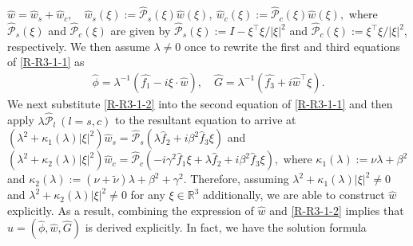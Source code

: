\documentclass[dvipdfmx,12pt]{article}
\begin{document}
$
\widehat{w}=\widehat{w}_s+\widehat{w}_c,\quad \widehat{w}_s(\xi):=\widehat{\mathcal{P}}_s(\xi)\widehat{w}(\xi),~\widehat{w}_c(\xi):=\widehat{\mathcal{P}}_c(\xi)\widehat{w}(\xi),
$
where $\widehat{\mathcal{P}}_s(\xi)$ and $\widehat{\mathcal{P}}_c(\xi)$ are given by $\widehat{\mathcal{P}}_s(\xi):=I-\xi^\top\xi/|\xi|^2$ and $\widehat{\mathcal{P}}_c(\xi):=\xi^\top\xi/|\xi|^2$, respectively. We then assume $\lambda\neq0$ once to rewrite the first and third equations of \eqref{R-R3-1-1} as 
\begin{gather}
\widehat{\phi}=\lambda^{-1} (\widehat{f_1}-i\xi\cdot\widehat{w}),\quad \widehat{G}=\lambda^{-1}(\widehat{f_3}+i\widehat{w}^\top\xi).
\label{R-R3-1-2}
\end{gather}
We next substitute \eqref{R-R3-1-2} into the second equation of \eqref{R-R3-1-1} and then apply $\lambda\widehat{\mathcal{P}}_l~(l=s,c)$ to the resultant equation to arrive at
$(\lambda^2+\kappa_1(\lambda)|\xi|^2)\widehat{w}_s=\widehat{\mathcal{P}}_s(\lambda\widehat{f}_2+i\beta^2\widehat{f}_3\xi) 
$
and 
$
(\lambda^2+\kappa_2(\lambda)|\xi|^2)\widehat{w}_c=\widehat{\mathcal{P}}_c(-i\gamma^2\widehat{f}_1\xi+\lambda\widehat{f}_2+i\beta^2\widehat{f}_3\xi),
$
where $\kappa_1(\lambda):=\nu\lambda+\beta^2$ and $\kappa_2(\lambda):=(\nu+\tilde{\nu})\lambda+\beta^2+\gamma^2$. Therefore, assuming $\lambda^2+\kappa_1(\lambda)|\xi|^2\neq0$ and $\lambda^2+\kappa_2(\lambda)|\xi|^2\neq0$ for any $\xi\in\mathbb{R}^3$ additionally, we are able to construct $\widehat{w}$ explicitly. As a result, combining the expression of $\widehat{w}$ and \eqref{R-R3-1-2} implies that $\widehat{u}=(\widehat{\phi},\widehat{w},\widehat{G})$ is derived explicitly.
In fact, we have the solution formula
\end{document}
